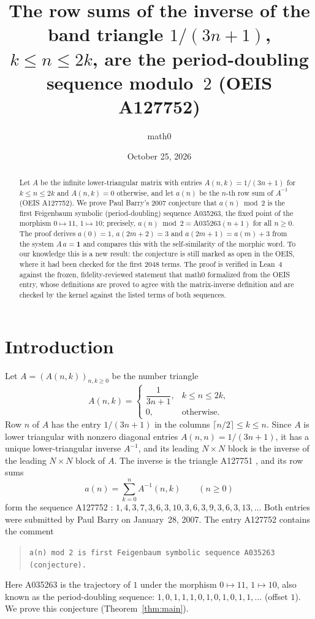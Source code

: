 \documentclass[11pt]{amsart}
\title[Row sums of an inverse band triangle modulo 2]{The row sums of the inverse of the band triangle $1/(3n+1)$, $k\le n\le 2k$, are the period-doubling sequence modulo~$2$ (OEIS A127752)}
\author{math0}
\date{October 25, 2026}
\theoremstyle{plain}
\theoremstyle{definition}
\begin{document}
\begin{abstract}
Let $A$ be the infinite lower-triangular matrix with entries $A(n,k)=1/(3n+1)$ for $k\le n\le 2k$ and $A(n,k)=0$ otherwise, and let $a(n)$ be the $n$-th row sum of $A^{-1}$ (OEIS A127752).
We prove Paul Barry's 2007 conjecture that $a(n)\bmod 2$ is the first Feigenbaum symbolic (period-doubling) sequence A035263, the fixed point of the morphism $0\mapsto11$, $1\mapsto10$; precisely, $a(n)\bmod 2=\mathrm{A035263}(n+1)$ for all $n\ge0$.
The proof derives $a(0)=1$, $a(2m+2)=3$ and $a(2m+1)=a(m)+3$ from the system $A\,a=\mathbf 1$ and compares this with the self-similarity of the morphic word.
To our knowledge this is a new result: the conjecture is still marked as open in the OEIS, where it had been checked for the first 2048 terms.
The proof is verified in Lean~4 against the frozen, fidelity-reviewed statement that math0 formalized from the OEIS entry, whose definitions are proved to agree with the matrix-inverse definition and are checked by the kernel against the listed terms of both sequences.
\end{abstract}
\maketitle

\section{Introduction}

Let $A=(A(n,k))_{n,k\ge0}$ be the number triangle
\[
  A(n,k)=\begin{cases}\dfrac1{3n+1}, & k\le n\le 2k,\\[4pt] 0, & \text{otherwise.}\end{cases}
\]
Row $n$ of $A$ has the entry $1/(3n+1)$ in the columns $\lceil n/2\rceil\le k\le n$. Since $A$ is lower triangular with nonzero diagonal entries $A(n,n)=1/(3n+1)$, it has a unique lower-triangular inverse $A^{-1}$, and its leading $N\times N$ block is the inverse of the leading $N\times N$ block of $A$. The inverse is the triangle A127751 \cite{A127751}, and its row sums
\[
  a(n)=\sum_{k=0}^{n}A^{-1}(n,k)\qquad(n\ge0)
\]
form the sequence A127752 \cite{A127752}: $1, 4, 3, 7, 3, 6, 3, 10, 3, 6, 3, 9, 3, 6, 3, 13,\dots$
Both entries were submitted by Paul Barry on January~28, 2007. The entry A127752 contains the comment
\begin{quote}
{\small\texttt{a(n) mod 2 is first Feigenbaum symbolic sequence A035263 (conjecture).}}
\end{quote}
Here A035263 \cite{A035263} is the trajectory of $1$ under the morphism $0\mapsto11$, $1\mapsto10$, also known as the period-doubling sequence: $1,0,1,1,1,0,1,0,1,0,1,1,\dots$ (offset $1$).
We prove this conjecture (Theorem~\ref{thm:main}).
\end{document}
